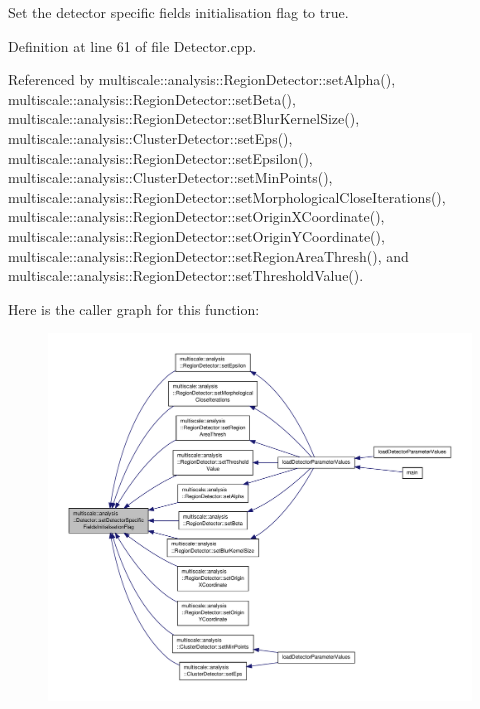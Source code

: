 Set the detector specific fields initialisation flag to true. 



Definition at line 61 of file Detector.\-cpp.



Referenced by multiscale\-::analysis\-::\-Region\-Detector\-::set\-Alpha(), multiscale\-::analysis\-::\-Region\-Detector\-::set\-Beta(), multiscale\-::analysis\-::\-Region\-Detector\-::set\-Blur\-Kernel\-Size(), multiscale\-::analysis\-::\-Cluster\-Detector\-::set\-Eps(), multiscale\-::analysis\-::\-Region\-Detector\-::set\-Epsilon(), multiscale\-::analysis\-::\-Cluster\-Detector\-::set\-Min\-Points(), multiscale\-::analysis\-::\-Region\-Detector\-::set\-Morphological\-Close\-Iterations(), multiscale\-::analysis\-::\-Region\-Detector\-::set\-Origin\-X\-Coordinate(), multiscale\-::analysis\-::\-Region\-Detector\-::set\-Origin\-Y\-Coordinate(), multiscale\-::analysis\-::\-Region\-Detector\-::set\-Region\-Area\-Thresh(), and multiscale\-::analysis\-::\-Region\-Detector\-::set\-Threshold\-Value().



Here is the caller graph for this function\-:\nopagebreak
\begin{figure}[H]
\begin{center}
\leavevmode
\includegraphics[width=350pt]{classmultiscale_1_1analysis_1_1Detector_a610c16fdecd543f15575f0effb08ff00_icgraph}
\end{center}
\end{figure}


